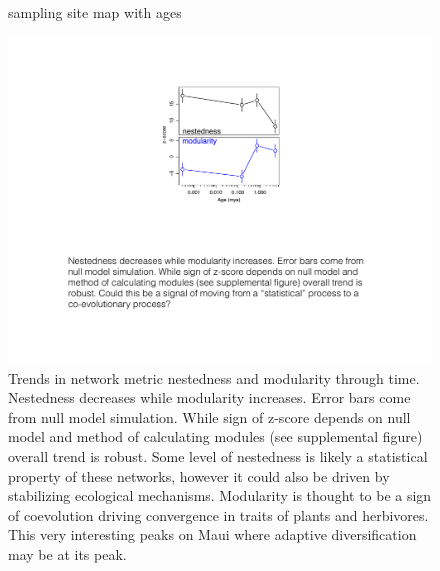 \documentclass[12pt]{article}
\begin{document}
\begin{figure}[!htb]
  \centering
  \caption{sampling site map with ages} 
  \label{fig:map}
\end{figure}

\begin{figure}[!hp]
  \centering
  \includegraphics[scale=1]{fig_netMets.pdf} 
  \caption{Trends in network metric nestedness and modularity through
    time. Nestedness decreases while modularity increases. Error bars
    come from null model simulation. While sign of z-score depends on
    null model and method of calculating modules (see supplemental
    figure) overall trend is robust. Some level of nestedness is
    likely a statistical property of these networks, however it could
    also be driven by stabilizing ecological mechanisms. Modularity is
    thought to be a sign of coevolution driving convergence in traits
    of plants and herbivores. This very interesting peaks on Maui
    where adaptive diversification may be at its peak.}
  \label{fig:netMet}
\end{figure}
\end{document}
